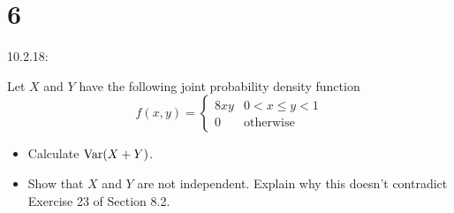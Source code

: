 \documentclass{article}
\begin{document}
\section*{6}
\begin{ques}
    10.2.18:

    Let $X$ and $Y$ have the following joint probability density function 
    $$f(x,y)=\begin{cases}
        8xy & 0<x\leq y<1\\
        0 & \text{otherwise}
    \end{cases}$$
    \begin{itemize}
        \item[(a)] Calculate $\mathrm{Var}(X+Y)$.
        \item[(b)] Show that $X$ and $Y$ are not independent. Explain why this doesn't contradict Exercise 23 of Section 8.2. 
    \end{itemize}
\end{ques}
\end{document}
